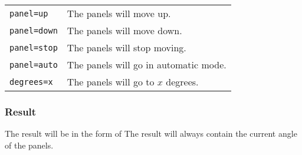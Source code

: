     \begin{tabular}{ll}
        \verb|panel=up| & The panels will move up. \\
        \verb|panel=down| & The panels will move down. \\
        \verb|panel=stop| & The panels will stop moving. \\
        \verb|panel=auto| & The panels will go in automatic mode. \\
        \verb|degrees=x| & The panels will go to $x$ degrees. \\
    \end{tabular}

    \subsubsection{Result}
    The result will be in the form of %
    The result will always contain the current angle of the panels.

